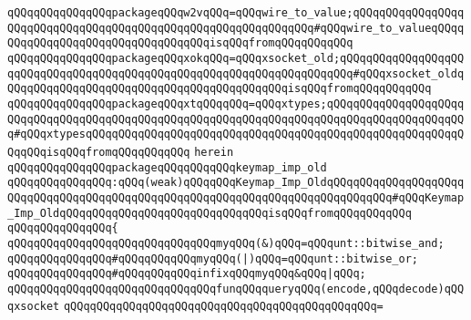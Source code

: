 \verb|qQQqqQQqqQQqqQQqpackageqQQqw2vqQQq=qQQqwire_to_value;qQQqqQQqqQQqqQQqqQQqqQQqqQQqqQQqqQQqqQQqqQQqqQQqqQQqqQQqqQQqqQQq#qQQqwire_to_valueqQQqqQQqqQQqqQQqqQQqqQQqqQQqqQQqqQQqisqQQqfromqQQqqQQqqQQq|\newline
\verb|qQQqqQQqqQQqqQQqpackageqQQqxokqQQq=qQQqxsocket_old;qQQqqQQqqQQqqQQqqQQqqQQqqQQqqQQqqQQqqQQqqQQqqQQqqQQqqQQqqQQqqQQqqQQqqQQq#qQQqxsocket_oldqQQqqQQqqQQqqQQqqQQqqQQqqQQqqQQqqQQqqQQqqQQqisqQQqfromqQQqqQQqqQQq|\newline
\verb|qQQqqQQqqQQqqQQqpackageqQQqxtqQQqqQQq=qQQqxtypes;qQQqqQQqqQQqqQQqqQQqqQQqqQQqqQQqqQQqqQQqqQQqqQQqqQQqqQQqqQQqqQQqqQQqqQQqqQQqqQQqqQQqqQQqqQQq#qQQqxtypesqQQqqQQqqQQqqQQqqQQqqQQqqQQqqQQqqQQqqQQqqQQqqQQqqQQqqQQqqQQqqQQqisqQQqfromqQQqqQQqqQQq|\newline
\verb|herein|\newline
\newline
\newline
\verb|qQQqqQQqqQQqqQQqpackageqQQqqQQqqQQqkeymap_imp_old|\newline
\verb|qQQqqQQqqQQqqQQq:qQQq(weak)qQQqqQQqKeymap_Imp_OldqQQqqQQqqQQqqQQqqQQqqQQqqQQqqQQqqQQqqQQqqQQqqQQqqQQqqQQqqQQqqQQqqQQqqQQqqQQqqQQq#qQQqKeymap_Imp_OldqQQqqQQqqQQqqQQqqQQqqQQqqQQqqQQqisqQQqfromqQQqqQQqqQQq|\newline
\verb|qQQqqQQqqQQqqQQq{|\newline
\newline
\verb|qQQqqQQqqQQqqQQqqQQqqQQqqQQqqQQqmyqQQq(&)qQQq=qQQqunt::bitwise_and;|\newline
\verb|qQQqqQQqqQQqqQQq#qQQqqQQqqQQqmyqQQq(|\verb#|)qQQq=qQQqunt::bitwise_or;#\newline
\newline
\verb|qQQqqQQqqQQqqQQq#qQQqqQQqqQQqinfixqQQqmyqQQq&qQQq|\verb#|qQQq;#\newline
\newline
\verb|qQQqqQQqqQQqqQQqqQQqqQQqqQQqqQQqfunqQQqqueryqQQq(encode,qQQqdecode)qQQqxsocket|\newline
\verb|qQQqqQQqqQQqqQQqqQQqqQQqqQQqqQQqqQQqqQQqqQQqqQQq=|\newline
